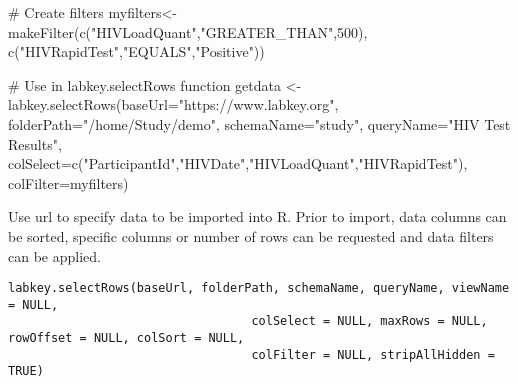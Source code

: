 \documentclass{article}
\begin{document}
\begin{Examples}
\begin{ExampleCode}

# Create filters
myfilters<- makeFilter(c("HIVLoadQuant","GREATER_THAN",500), c("HIVRapidTest","EQUALS","Positive"))

# Use in labkey.selectRows function
getdata <- labkey.selectRows(baseUrl="https://www.labkey.org", folderPath="/home/Study/demo", schemaName="study", queryName="HIV Test Results", colSelect=c("ParticipantId","HIVDate","HIVLoadQuant","HIVRapidTest"), colFilter=myfilters)


\end{ExampleCode}
\end{Examples}

\begin{Description}\relax
Use url to specify data to be imported into R. Prior to import, data columns
can be sorted, specific columns or number of rows can be requested and
data filters can be applied.
\end{Description}
\begin{Usage}
\begin{verbatim}
labkey.selectRows(baseUrl, folderPath, schemaName, queryName, viewName = NULL, 
                                  colSelect = NULL, maxRows = NULL, rowOffset = NULL, colSort = NULL, 
                                  colFilter = NULL, stripAllHidden = TRUE)
\end{verbatim}
\end{Usage}
\end{document}
